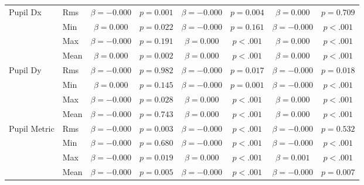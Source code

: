 \begin{tabular}{llcc|cc|cc}
\midrule
\multirow{4}{*}{Pupil Dx} & Rms & $\beta = -0.000$ & $p = 0.001$ & $\beta = -0.000$ & $p = 0.004$ & $\beta = 0.000$ & $p = 0.709$ \\
 & Min & $\beta = 0.000$ & $p = 0.022$ & $\beta = -0.000$ & $p = 0.161$ & $\beta = -0.000$ & $p < .001$ \\
 & Max & $\beta = -0.000$ & $p = 0.191$ & $\beta = 0.000$ & $p < .001$ & $\beta = 0.000$ & $p < .001$ \\
 & Mean & $\beta = 0.000$ & $p = 0.002$ & $\beta = 0.000$ & $p < .001$ & $\beta = 0.000$ & $p < .001$ \\
\midrule
\multirow{4}{*}{Pupil Dy} & Rms & $\beta = -0.000$ & $p = 0.982$ & $\beta = -0.000$ & $p = 0.017$ & $\beta = -0.000$ & $p = 0.018$ \\
 & Min & $\beta = 0.000$ & $p = 0.145$ & $\beta = -0.000$ & $p = 0.001$ & $\beta = -0.000$ & $p < .001$ \\
 & Max & $\beta = -0.000$ & $p = 0.028$ & $\beta = 0.000$ & $p < .001$ & $\beta = 0.000$ & $p < .001$ \\
 & Mean & $\beta = -0.000$ & $p = 0.743$ & $\beta = 0.000$ & $p < .001$ & $\beta = 0.000$ & $p < .001$ \\
\midrule
\multirow{4}{*}{Pupil Metric} & Rms & $\beta = -0.000$ & $p = 0.003$ & $\beta = -0.000$ & $p < .001$ & $\beta = -0.000$ & $p = 0.532$ \\
 & Min & $\beta = -0.000$ & $p = 0.680$ & $\beta = -0.000$ & $p < .001$ & $\beta = -0.000$ & $p < .001$ \\
 & Max & $\beta = -0.000$ & $p = 0.019$ & $\beta = 0.000$ & $p < .001$ & $\beta = 0.001$ & $p < .001$ \\
 & Mean & $\beta = -0.000$ & $p = 0.005$ & $\beta = -0.000$ & $p < .001$ & $\beta = -0.000$ & $p = 0.007$ \\
\midrule
\bottomrule
\end{tabular}